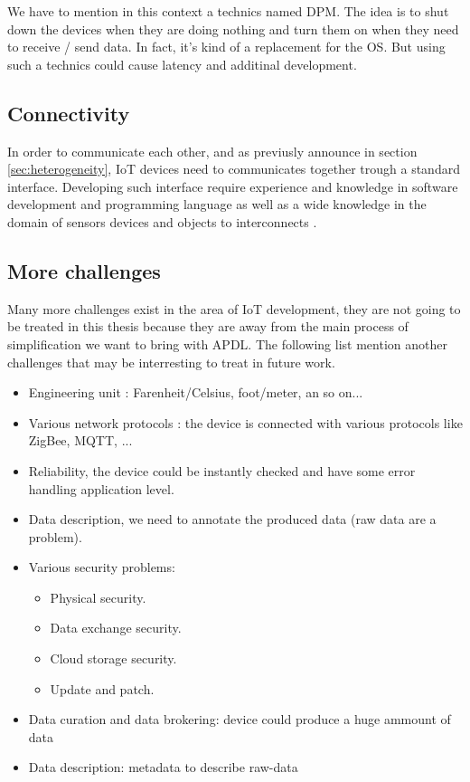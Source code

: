 We have to mention in this context a technics named \gls{DPM}. The idea is to
shut down the devices when they are doing nothing and turn them on when they
need to receive / send data. In fact, it's kind of a replacement for the
\gls{OS}. But using such a technics could cause latency and additinal development.

\subsection{Connectivity}
\label{sec:connectivity}

In order to communicate each other, and as previusly announce in section
\ref{sec:heterogeneity}, \gls{IoT} devices need to communicates together trough
a standard interface. Developing such interface require experience and knowledge
in software development and programming language as well as a wide knowledge in
the domain of sensors devices and objects to interconnects \cite{midgar}.

\subsection{More challenges}
\label{sec:more_challenges}

Many more challenges exist in the area of \gls{IoT} development, they are not
going to be treated in this thesis because they are away from the main process
of simplification we want to bring with \gls{APDL}. The following list mention
another challenges that may be interresting to treat in future work.

\begin{itemize}
\item Engineering unit : Farenheit/Celsius, foot/meter, an so on...
\item Various network protocols : the device is connected with various protocols
  like ZigBee, MQTT, ...
\item Reliability, the device could be instantly checked and have some error
  handling application level.
\item Data description, we need to annotate the produced data (raw data are a
  problem).
\item Various security problems:
  \begin{itemize}
  \item Physical security.
  \item Data exchange security.
  \item Cloud storage security.
  \item Update and patch.
  \end{itemize}
\item Data curation and data brokering: device could produce a huge ammount of
  data
\item Data description: metadata to describe raw-data
\end{itemize}


